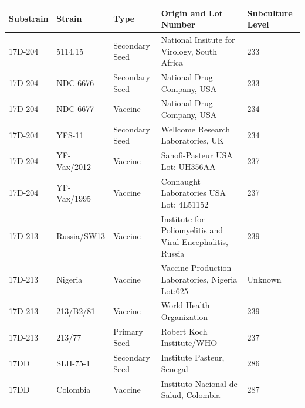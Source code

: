 \footnotesize
\begin{tabu} to \columnwidth {X[.5,l]X[.5,l]X[.5,l]X[l]X[l]}
	\rowfont[1]{\bfseries}
	\toprule
			Substrain	&	Strain	&	Type	&	Origin and Lot Number	&	Subculture Level                                     \\ \midrule
			17D-204		&	5114.15	&	Secondary Seed	&	National Insitute for Virology,  South Africa	&	233 \\
			17D-204		&	NDC-6676	&	Secondary Seed	&	National Drug Company, USA	& 233          \\
			17D-204		&	NDC-6677&	Vaccine &	National Drug Company, USA &	234          \\
			17D-204		&	YFS-11	&	Secondary Seed	&	Wellcome Research Laboratories, UK	&	234           \\
			17D-204		&	YF-Vax/2012	&	Vaccine	&Sanofi-Pasteur USA \newline Lot: UH356AA &	237  \\
			17D-204		&	YF-Vax/1995	&	Vaccine	&Connaught Laboratories	USA Lot: 4L51152 & 237                \\
			17D-213		&	Russia/SW13	&	Vaccine	&	Institute for Poliomyelitis and Viral Encephalitis, Russia &	239       \\
			17D-213		&	Nigeria	&	Vaccine	&	Vaccine Production Laboratories, \newline Nigeria Lot:625 &Unknown                 \\
			17D-213		&	213/B2/81	&	Vaccine	& World Health Organization	& 239                \\
			17D-213		&	213/77	&	Primary Seed	&	Robert Koch Institute/WHO &	237                 \\
			17DD		&	SLII-75-1 &	Secondary Seed	&	Institute Pasteur, Senegal	& 286      \\ 
			17DD		&	Colombia &	Vaccine	&	Instituto Nacional de Salud, Colombia	& 287      \\ \bottomrule
	\end{tabu}
	
